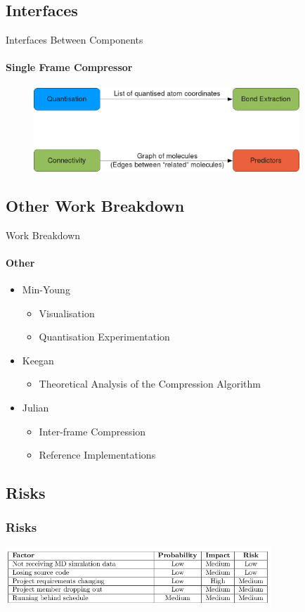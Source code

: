 \documentclass{beamer}
\begin{document}
\subsection{Interfaces}
\begin{frame}{Interfaces Between Components}
  \framesubtitle{Single Frame Compressor}
  \begin{figure}
    \centering
    \includegraphics[width=100mm]{interfaces}
  \end{figure}
\end{frame}


\subsection{Other Work Breakdown}
\begin{frame}{Work Breakdown}
  \framesubtitle{Other}
  \begin{itemize}
  \item Min-Young
    \begin{itemize}
    \item Visualisation
    \item Quantisation Experimentation
    \end{itemize}
  \item Keegan
    \begin{itemize}
    \item Theoretical Analysis of the Compression Algorithm
    \end{itemize}
  \item Julian
    \begin{itemize}
    \item Inter-frame Compression
    \item Reference Implementations
    \end{itemize}
  \end{itemize}
\end{frame}


\subsection{Risks}
\begin{frame}
  \frametitle{Risks}
  \includegraphics[width=100mm]{risks}    
\end{frame}
\end{document}
